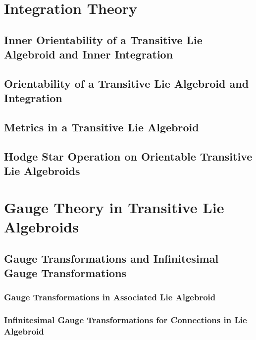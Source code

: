 \documentclass[12pt]{report}
\theoremstyle{definition}
\begin{document}
\chapter{Integration Theory}\label{chp:integration}


\section{Inner Orientability of a Transitive Lie Algebroid and Inner Integration}

\section{Orientability of a Transitive Lie Algebroid and Integration}

\section{Metrics in a Transitive Lie Algebroid}

\section{Hodge Star Operation on Orientable Transitive Lie Algebroids}

\chapter{Gauge Theory in Transitive Lie Algebroids}\label{chp:gaugeTh}


\section{Gauge Transformations and Infinitesimal Gauge Transformations}

\subsection{Gauge Transformations in Associated Lie Algebroid}

\subsection{Infinitesimal Gauge Transformations for Connections in Lie Algebroid}
\end{document}
